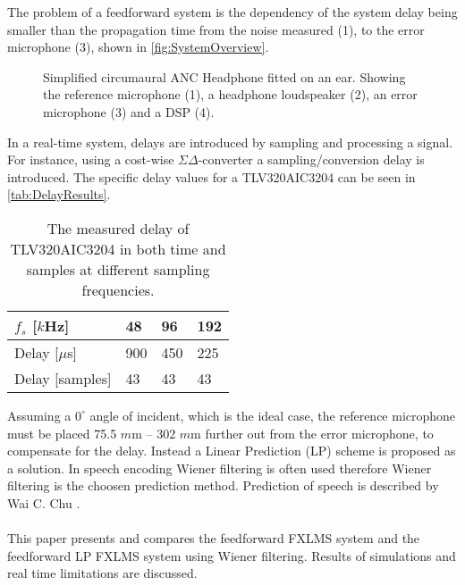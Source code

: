 The problem of a feedforward system is the dependency of the system delay being smaller than the propagation time from the noise measured (1), to the error microphone (3), shown in \autoref{fig:SystemOverview}.
\begin{figure}[H]
	\centering
	
	\caption{Simplified circumaural ANC Headphone fitted on an ear. Showing the reference microphone (1), a headphone loudspeaker (2), an error microphone (3) and a DSP (4).}
	\label{fig:SystemOverview}
\end{figure}
In a real-time system, delays are introduced by sampling and processing a signal. For instance, using a cost-wise $\Sigma\Delta$-converter a sampling/conversion delay is introduced. The specific delay values for a TLV320AIC3204 can be seen in \autoref{tab:DelayResults}.




\begin{table}[H]
	\centering
	\begin{tabular}{|l|l|l|l|}
	\hline
	$f_s$ {[}$k$Hz{]} & 48 & 96 & 192 \\ \hline
	Delay {[}$\mu$s{]} & 900 & 450 & 225 \\ \hline
	Delay {[}samples{]} & 43 & 43 & 43 \\ \hline
\end{tabular}
	\caption{The measured delay of TLV320AIC3204 in both time and samples at different sampling frequencies.}
	\label{tab:DelayResults}
\end{table}

Assuming a $\text{0}^{\circ}$ angle of incident, which is the ideal case, the reference microphone must be placed 75.5 $m$m -- 302 $m$m further out from the error microphone, to compensate for the delay. Instead a Linear Prediction (LP) scheme is proposed as a solution. In speech encoding Wiener filtering is often used \cite{Speech} therefore Wiener filtering is the choosen prediction method.
Prediction of speech is described by Wai C. Chu \cite{Speech}. 
\\\\
This paper presents and compares the feedforward FXLMS system and the feedforward LP FXLMS system using Wiener filtering. Results of simulations and real time limitations are discussed.  
        
